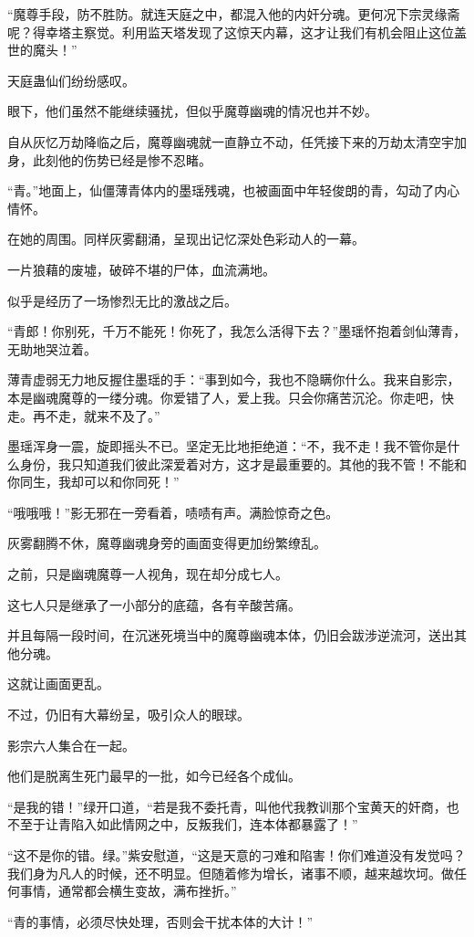 \begin{this_body}
“魔尊手段，防不胜防。就连天庭之中，都混入他的内奸分魂。更何况下宗灵缘斋呢？得幸塔主察觉。利用监天塔发现了这惊天内幕，这才让我们有机会阻止这位盖世的魔头！”

天庭蛊仙们纷纷感叹。

眼下，他们虽然不能继续骚扰，但似乎魔尊幽魂的情况也并不妙。

自从灰忆万劫降临之后，魔尊幽魂就一直静立不动，任凭接下来的万劫太清空宇加身，此刻他的伤势已经是惨不忍睹。

“青。”地面上，仙僵薄青体内的墨瑶残魂，也被画面中年轻俊朗的青，勾动了内心情怀。

在她的周围。同样灰雾翻涌，呈现出记忆深处色彩动人的一幕。

一片狼藉的废墟，破碎不堪的尸体，血流满地。

似乎是经历了一场惨烈无比的激战之后。

“青郎！你别死，千万不能死！你死了，我怎么活得下去？”墨瑶怀抱着剑仙薄青，无助地哭泣着。

薄青虚弱无力地反握住墨瑶的手：“事到如今，我也不隐瞒你什么。我来自影宗，本是幽魂魔尊的一缕分魂。你爱错了人，爱上我。只会你痛苦沉沦。你走吧，快走。再不走，就来不及了。”

墨瑶浑身一震，旋即摇头不已。坚定无比地拒绝道：“不，我不走！我不管你是什么身份，我只知道我们彼此深爱着对方，这才是最重要的。其他的我不管！不能和你同生，我却可以和你同死！”

“哦哦哦！”影无邪在一旁看着，啧啧有声。满脸惊奇之色。

灰雾翻腾不休，魔尊幽魂身旁的画面变得更加纷繁缭乱。

之前，只是幽魂魔尊一人视角，现在却分成七人。

这七人只是继承了一小部分的底蕴，各有辛酸苦痛。

并且每隔一段时间，在沉迷死境当中的魔尊幽魂本体，仍旧会跋涉逆流河，送出其他分魂。

这就让画面更乱。

不过，仍旧有大幕纷呈，吸引众人的眼球。

影宗六人集合在一起。

他们是脱离生死门最早的一批，如今已经各个成仙。

“是我的错！”绿开口道，“若是我不委托青，叫他代我教训那个宝黄天的奸商，也不至于让青陷入如此情网之中，反叛我们，连本体都暴露了！”

“这不是你的错。绿。”紫安慰道，“这是天意的刁难和陷害！你们难道没有发觉吗？我们身为凡人的时候，还不明显。但随着修为增长，诸事不顺，越来越坎坷。做任何事情，通常都会横生变故，满布挫折。”

“青的事情，必须尽快处理，否则会干扰本体的大计！”


\end{this_body}
